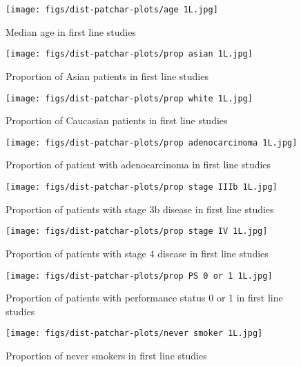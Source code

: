 \documentclass[11pt,final,fleqn]{article}\usepackage[]{graphicx}\usepackage[]{color}
\theoremstyle{plain}
\begin{document}
\begin{appendices}
\begin{figure}
\centering
\texttt{[image: figs/dist-patchar-plots/age 1L.jpg]}
\caption{Median age in first line studies}\label{fig:age-1l}
\end{figure}

\begin{figure}
\centering
\texttt{[image: figs/dist-patchar-plots/prop asian 1L.jpg]}
\caption{Proportion of Asian patients in first line studies}\label{fig:asian-1l}
\end{figure}

\begin{figure}
\centering
\texttt{[image: figs/dist-patchar-plots/prop white 1L.jpg]}
\caption{Proportion of Caucasian patients in first line studies}\label{fig:white-1l}
\end{figure}

\begin{figure}
\centering
\texttt{[image: figs/dist-patchar-plots/prop adenocarcinoma 1L.jpg]}
\caption{Proportion of patient with adenocarcinoma in first line studies}\label{fig:adeno-1l}
\end{figure}

\begin{figure}
\centering
\texttt{[image: figs/dist-patchar-plots/prop stage IIIb 1L.jpg]}
\caption{Proportion of patients with stage 3b disease in first line studies}\label{fig:stageiiib-1l}
\end{figure}

\begin{figure}
\centering
\texttt{[image: figs/dist-patchar-plots/prop stage IV 1L.jpg]}
\caption{Proportion of patients with stage 4 disease in first line studies}\label{fig:stageiv-1l}
\end{figure}

\begin{figure}
\centering
\texttt{[image: figs/dist-patchar-plots/prop PS 0 or 1 1L.jpg]}
\caption{Proportion of patients with performance status 0 or 1 in first line studies}\label{fig:ps01-1l}
\end{figure}

\begin{figure}
\centering
\texttt{[image: figs/dist-patchar-plots/never smoker 1L.jpg]}
\caption{Proportion of never smokers in first line studies}\label{fig:neversmoker-1l}
\end{figure}


\end{appendices}
\end{document}
